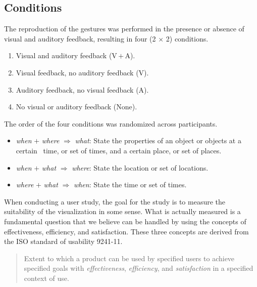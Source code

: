 \subsection{Conditions}
The reproduction of the gestures was performed in the presence or
absence of visual and auditory feedback, resulting in four (2 $\times$ 2) conditions.
\begin{enumerate}
\item Visual and auditory feedback (V\,$+$\,A).
\item Visual feedback, no auditory feedback (V).
\item Auditory feedback, no visual feedback (A).
\item No visual or auditory feedback (None).
\end{enumerate}
The order of the four conditions was randomized across participants.
\begin{itemize}
    \item \textit{when} $+$ \textit{where} $\Rightarrow$
          \textit{what}: State the properties of an object or objects at a
          certain ~time, or set of times,  and a certain place, or set of places.
    \item \textit{when} $+$ \textit{what} $\Rightarrow$
          \textit{where}: State the location or set of locations.
    \item \textit{where} $+$ \textit{what} $\Rightarrow$
          \textit{when}: State the time or set of times.
\end{itemize}
When conducting a user study, the goal for the study is to measure
the suitability of the visualization in some sense. What is actually
measured is a fundamental question that we believe can be handled by
using the concepts of {effectiveness}, {efficiency},
and {satisfaction}. These three concepts are derived from the
ISO standard of usability 9241-11.
\begin{quote}
    Extent to which a product can be used by specified users to
    achieve specified goals with \textit{effectiveness},
    \textit{efficiency}, and \textit{satisfaction} in a specified context of use.
\end{quote}

